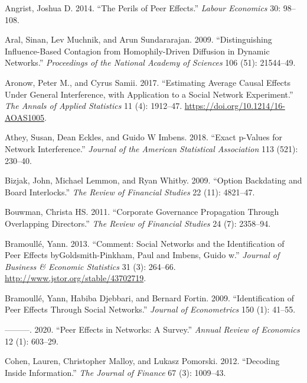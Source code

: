 \documentclass[
  a4paper,
]{article}
\newlength{\cslhangindent}
\newenvironment{CSLReferences}[2] %
 {\begin{list}{}{%
  \setlength{\itemindent}{0pt}
  \setlength{\leftmargin}{0pt}
  \setlength{\parsep}{0pt}
  \ifodd #1
   \setlength{\leftmargin}{\cslhangindent}
   \setlength{\itemindent}{-1\cslhangindent}
  \fi
  \setlength{\itemsep}{#2\baselineskip}}}
 {\end{list}}
\begin{document}
\label{refs}
\begin{CSLReferences}{1}{0}
Angrist, Joshua D. 2014. {``The Perils of Peer Effects.''} \emph{Labour
Economics} 30: 98--108.

Aral, Sinan, Lev Muchnik, and Arun Sundararajan. 2009. {``Distinguishing
Influence-Based Contagion from Homophily-Driven Diffusion in Dynamic
Networks.''} \emph{Proceedings of the National Academy of Sciences} 106
(51): 21544--49.

Aronow, Peter M., and Cyrus Samii. 2017. {``Estimating Average Causal
Effects Under General Interference, with Application to a Social Network
Experiment.''} \emph{The Annals of Applied Statistics} 11 (4): 1912--47.
\url{https://doi.org/10.1214/16-AOAS1005}.

Athey, Susan, Dean Eckles, and Guido W Imbens. 2018. {``Exact p-Values
for Network Interference.''} \emph{Journal of the American Statistical
Association} 113 (521): 230--40.

Bizjak, John, Michael Lemmon, and Ryan Whitby. 2009. {``Option
Backdating and Board Interlocks.''} \emph{The Review of Financial
Studies} 22 (11): 4821--47.

Bouwman, Christa HS. 2011. {``Corporate Governance Propagation Through
Overlapping Directors.''} \emph{The Review of Financial Studies} 24 (7):
2358--94.

Bramoullé, Yann. 2013. {``Comment: Social Networks and the
Identification of Peer Effects byGoldsmith-Pinkham, Paul and Imbens,
Guido w.''} \emph{Journal of Business \& Economic Statistics} 31 (3):
264--66. \url{http://www.jstor.org/stable/43702719}.

Bramoullé, Yann, Habiba Djebbari, and Bernard Fortin. 2009.
{``Identification of Peer Effects Through Social Networks.''}
\emph{Journal of Econometrics} 150 (1): 41--55.

---------. 2020. {``Peer Effects in Networks: A Survey.''} \emph{Annual
Review of Economics} 12 (1): 603--29.

Cohen, Lauren, Christopher Malloy, and Lukasz Pomorski. 2012.
{``Decoding Inside Information.''} \emph{The Journal of Finance} 67 (3):
1009--43.


\end{CSLReferences}
\end{document}
